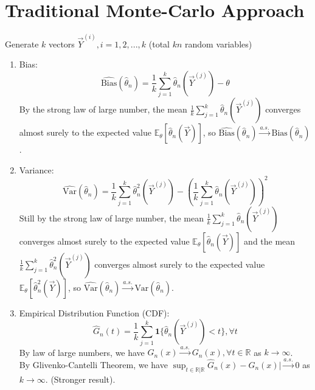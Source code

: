 \documentclass[11pt]{elegantbook}
\begin{document}
\section{Traditional Monte-Carlo Approach}
Generate $k$ vectors $\vec{Y}^{(i)},i=1,2,...,k$ (total $kn$ random variables)
\begin{enumerate}[(1).]
    \item Bias: $$\widehat{\text{Bias}}(\hat{\theta}_n)=\frac{1}{k}\sum_{j=1}^k \hat{\theta}_n(\vec{Y}^{(j)})-\theta$$
    By the strong law of large number, the mean $\frac{1}{k}\sum_{j=1}^k \hat{\theta}_n(\vec{Y}^{(j)})$ converges almost surely to the expected value $\mathbb{E}_{\theta}[\hat{\theta}_n(\vec{Y})]$, so $\widehat{\text{Bias}}(\hat{\theta}_n) \stackrel{a.s.}{\longrightarrow} \text{Bias}(\hat{\theta}_n)$.
    \item Variance: $$\widehat{\text{Var}}(\hat{\theta}_n)=\frac{1}{k}\sum_{j=1}^k \hat{\theta}^2_n(\vec{Y}^{(j)})-\left(\frac{1}{k}\sum_{j=1}^k \hat{\theta}_n(\vec{Y}^{(j)})\right)^2$$
    Still by the strong law of large number, the mean $\frac{1}{k}\sum_{j=1}^k \hat{\theta}_n(\vec{Y}^{(j)})$ converges almost surely to the expected value $\mathbb{E}_{\theta}[\hat{\theta}_n(\vec{Y})]$ and the mean $\frac{1}{k}\sum_{j=1}^k \hat{\theta}^2_n(\vec{Y}^{(j)})$ converges almost surely to the expected value $\mathbb{E}_{\theta}[\hat{\theta}^2_n(\vec{Y})]$, so $\widehat{\text{Var}}(\hat{\theta}_n) \stackrel{a.s.}{\longrightarrow} \text{Var}(\hat{\theta}_n)$.
    \item Empirical Distribution Function (CDF): $$\hat{G}_{n}(t)=\frac{1}{k}\sum_{j=1}^k \mathbf{1}\{\hat{\theta}_n(\vec{Y}^{(j)})<t\},\forall t$$
    By law of large numbers, we have $\hat{G}_n(x) \stackrel{a.s.}{\longrightarrow} G_n(x),\forall t\in \mathbb{R}$ as $k \rightarrow \infty$.\\
    By Glivenko-Cantelli Theorem, we have $\sup_{t\in \mathbb{R} |\mathbb{R}}\hat{G}_n(x) - G_n(x)| \stackrel{a.s.}{\longrightarrow} 0$ as $k \rightarrow \infty$. (Stronger result).
\end{enumerate}
\end{document}
